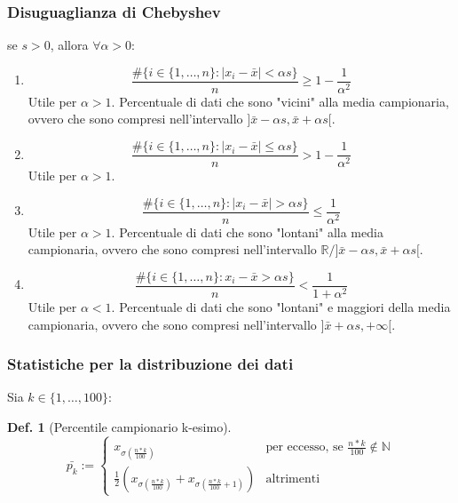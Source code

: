 \documentclass{article}
\newtheorem{definition}{Def.}[section]
\begin{document}
\subsubsection{Disuguaglianza di Chebyshev}
se $s>0$, allora $\forall \alpha > 0$:
\begin{enumerate}
	\item \begin{equation}
			\frac{\# \{i \in \{1, \dots, n\}: |x_i - \bar{x}| < \alpha s\}}{n}
			\geq 1 - \frac{1}{\alpha^2}
		\end{equation}
		Utile per $\alpha > 1$.
		Percentuale di dati che sono "vicini" alla media campionaria, ovvero che
		sono compresi nell'intervallo $]\bar{x} - \alpha s, \bar{x} + \alpha s[$.

	\item \begin{equation}
			\frac{\#\{i \in \{1, \dots, n\}: |x_i - \bar{x}| \leq \alpha s\}}{n}
			> 1 - \frac{1}{\alpha^2}
		\end{equation}
		Utile per $\alpha > 1$.
	
	\item \begin{equation}
			\frac{\#\{i \in \{1, \dots, n\}: |x_i - \bar{x}| > \alpha s\}}{n}
			\leq \frac{1}{\alpha^2}
		\end{equation}
		Utile per $\alpha > 1$.
		Percentuale di dati che sono "lontani" alla media campionaria, ovvero che
		sono compresi nell'intervallo $\mathbb{R} / ]\bar{x} - \alpha s, \bar{x} + \alpha s[$.
	
	\item \begin{equation}
			\frac{\#\{i \in \{1, \dots, n\}: x_i - \bar{x} > \alpha s\}}{n}
			< \frac{1}{1 + \alpha^2}
		\end{equation}
		Utile per $\alpha < 1$.
		Percentuale di dati che sono "lontani" e maggiori della media
		campionaria, ovvero che sono compresi nell'intervallo $] \bar{x} + \alpha s, +\infty[$.
\end{enumerate}

\subsubsection{Statistiche per la distribuzione dei dati}
Sia $k \in \{1, \dots, 100\}$:

\begin{definition}[Percentile campionario k-esimo]
\begin{equation}
	\bar{p_k} := 
\begin{cases}
	x_{\sigma(\frac{n * k}{100})} & \text{per eccesso, se } \frac{n * k}{100}
	\not\in \mathbb{N} \\
	\frac{1}{2}(x_{\sigma(\frac{n * k}{100})} + x_{\sigma(\frac{n * k}{100} +
	1)}) & \text{altrimenti}
\end{cases}
\end{equation}
\end{definition}
\end{document}
